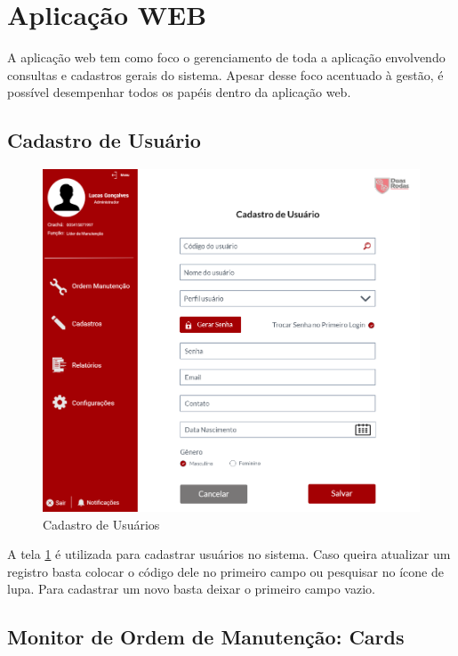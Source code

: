 \section{Aplicação WEB}
A aplicação web tem como foco o gerenciamento de toda a aplicação envolvendo consultas e cadastros gerais do sistema.
Apesar desse foco acentuado à gestão, é possível desempenhar todos os papéis dentro da aplicação web.

\subsection{Cadastro de Usuário}

\begin{figure}[H]
	\caption{\label{web_cad-user}Cadastro de Usuários}
	\begin{center}
		\includegraphics[scale=0.70]{./Figuras/web/cad-user.png}
	\end{center}
\end{figure}

A tela \ref{web_cad-user} é utilizada para cadastrar usuários no sistema. Caso queira atualizar um registro basta colocar o código dele no primeiro campo ou pesquisar no ícone de lupa. Para cadastrar um novo basta deixar o primeiro campo vazio.

\subsection{Monitor de Ordem de Manutenção: Cards}

